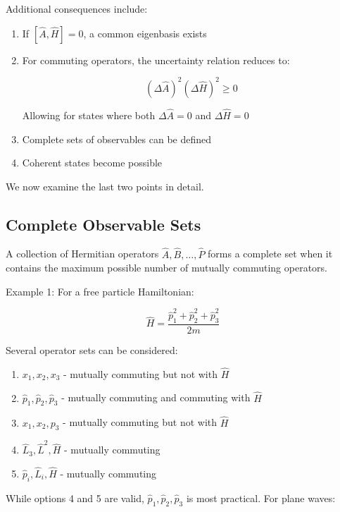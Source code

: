 \documentclass[italian]{HKNdocument}
\begin{document}
Additional consequences include:
\begin{enumerate}
  \item If $[\hat{A}, \hat{H}]=0$, a common eigenbasis exists
  \item For commuting operators, the uncertainty relation reduces to:

\begin{equation}
(\Delta \hat{A})^{2}(\Delta \hat{H})^{2} \geq 0
\end{equation}

  Allowing for states where both $\Delta \hat{A}=0$ and $\Delta \hat{H}=0$
  \item Complete sets of observables can be defined
  \item Coherent states become possible
\end{enumerate}

We now examine the last two points in detail.

\subsection{Complete Observable Sets}
A collection of Hermitian operators $\hat{A}, \hat{B}, \ldots, \hat{P}$ forms a complete set when it contains the maximum possible number of mutually commuting operators.

Example 1: For a free particle Hamiltonian:

\begin{equation}
\hat{H}=\frac{\hat{p}_{1}^{2}+\hat{p}_{2}^{2}+\hat{p}_{3}^{2}}{2 m}
\end{equation}

Several operator sets can be considered:
\begin{enumerate}
  \item $x_{1}, x_{2}, x_{3}$ - mutually commuting but not with $\hat{H}$
  \item $\hat{p}_{1}, \hat{p}_{2}, \hat{p}_{3}$ - mutually commuting and commuting with $\hat{H}$
  \item $x_{1}, x_{2}, p_{3}$ - mutually commuting but not with $\hat{H}$
  \item $\hat{L}_{3}, \hat{L}^{2}, \hat{H}$ - mutually commuting
  \item $\hat{p}_{i}, \hat{L}_{i}, \hat{H}$ - mutually commuting
\end{enumerate}

While options 4 and 5 are valid, $\hat{p}_{1}, \hat{p}_{2}, \hat{p}_{3}$ is most practical. For plane waves:
\end{document}
